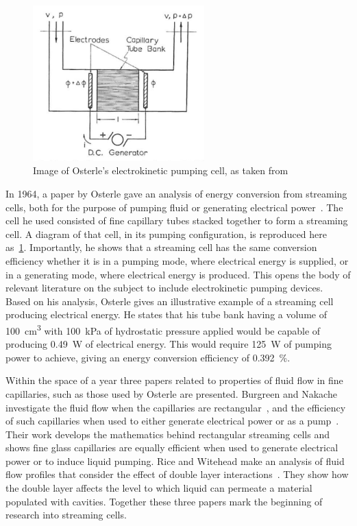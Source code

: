     \begin{figure}
      \centering
      \includegraphics[height=6cm]{content/pt1/Osterle_ElectrokineticCell.png}
      \caption{\label{fig:Osterle_cell}Image of Osterle's electrokinetic pumping cell, as taken from \cite{Osterle1964}}
    \end{figure}
    In 1964, a paper by Osterle gave an analysis of energy conversion from streaming cells, both for the purpose of pumping fluid or generating electrical power~\cite{Osterle1964}.
    The cell he used consisted of fine capillary tubes stacked together to form a streaming cell.
    A diagram of that cell, in its pumping configuration, is reproduced here as~\cref{fig:Osterle_cell}.
    Importantly, he shows that a streaming cell has the same conversion efficiency whether it is in a pumping mode, where electrical energy is supplied, or in a generating mode, where electrical energy is produced.
    This opens the body of relevant literature on the subject to include electrokinetic pumping devices.
    Based on his analysis, Osterle gives an illustrative example of a streaming cell producing electrical energy.
    He states that his tube bank having a volume of \SI{100}{\centi\meter\cubed} with \SI{100}{\kilo\pascal} of hydrostatic pressure applied would be capable of producing \SI{0.49}{\watt} of electrical energy.
    This would require \SI{125}{\watt} of pumping power to achieve, giving an energy conversion efficiency of \SI{0.392}{\percent}.


    Within the space of a year three papers related to properties of fluid flow in fine capillaries, such as those used by Osterle are presented.
    Burgreen and Nakache investigate the fluid flow when the capillaries are rectangular~\cite{Burgreen1964}, and the efficiency of such capillaries when used to either generate electrical power or as a pump~\cite{Burgreen1965}.
    Their work develops the mathematics behind rectangular streaming cells and shows fine glass capillaries are equally efficient when used to generate electrical power or to induce liquid pumping.
    Rice and Witehead make an analysis of fluid flow profiles that consider the effect of double layer interactions~\cite{Rice1965}.
    They show how the double layer affects the level to which liquid can permeate a material populated with cavities.
    Together these three papers mark the beginning of research into streaming cells.

